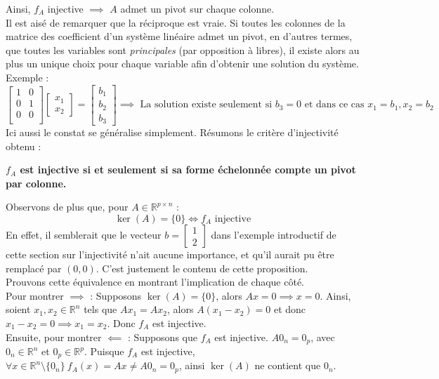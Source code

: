 \documentclass{article}
\newcommand{\R}{\mathbb{R}}
\newcommand{\cross}{\times}
\begin{document}
\noindent Ainsi, $f_A$ injective $\implies$ $A$ admet un pivot sur chaque colonne. \\

\noindent Il est aisé de remarquer que la réciproque est vraie. Si toutes les colonnes de la matrice des coefficient d'un système linéaire admet un pivot, en d'autres termes, que toutes les variables sont \textit{principales} (par opposition à libres), il existe alors au plus un unique choix pour chaque variable afin d'obtenir une solution du système. Exemple :
$$\begin{bmatrix}
1 & 0\\
0 & 1\\
0 & 0\\
\end{bmatrix}\begin{bmatrix}
x_1 \\ x_2
\end{bmatrix} = \begin{bmatrix}
b_1 \\ b_2 \\ b_3
\end{bmatrix} \implies  \text{ La solution existe seulement si }b_3 = 0\text{ et dans ce cas }x_1 = b_1, x_2 = b_2
$$
Ici aussi le constat se généralise simplement. Résumons le critère d'injectivité obtenu :
\begin{center}
    \textbf{$f_A$ est injective si et seulement si sa forme échelonnée compte un pivot par colonne.}
\end{center}

\noindent Observons de plus que, pour $A \in \R^{p \cross n}$ :
$$\ker(A) = \{0\} \iff f_A \text{ injective}$$
\noindent En effet, il semblerait que le vecteur $b = \begin{bmatrix}
1 \\ 2 
\end{bmatrix}$ dans l'exemple introductif de cette section sur l'injectivité n'ait aucune importance, et qu'il aurait pu être remplacé par $(0,0)$. C'est justement le contenu de cette proposition. \\

\noindent Prouvons cette équivalence en montrant l'implication de chaque côté. \\
\noindent Pour montrer $\implies$ : Supposons $\ker(A) = \{0\}$, alors $Ax = 0 \implies x = 0$. Ainsi, soient $x_1, x_2 \in \R^n$ tels que $Ax_1 = Ax_2$, alors $A(x_1-x_2) = 0$ et donc $x_1 - x_2 = 0 \implies x_1 = x_2$. Donc $f_A$ est injective.\\
\noindent Ensuite, pour montrer $\impliedby$ : Supposons que $f_A$ est injective. $A0_{n} = 0_{p}$, avec $0_n \in \R^n$ et $0_p \in \R^p$. Puisque $f_A$ est injective, $\forall x \in \R^n \setminus \{0_n\} \ f_A(x) = Ax \neq A0_n = 0_p$, ainsi $\ker(A)$ ne contient que $0_n$.\\
\end{document}
